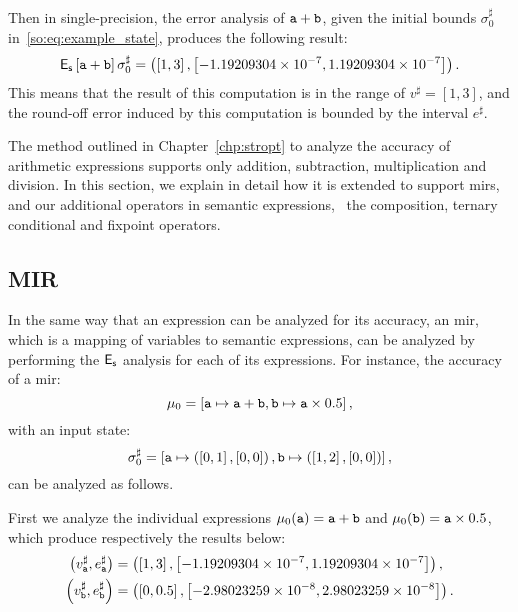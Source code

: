 Then in single-precision, the error analysis of $\texttt{a} + \texttt{b}$, given the
initial bounds $\sigma^\sharp_0$ in~\eqref{so:eq:example_state}, produces the
following result:
\begin{equation}
    \operatorname{\mathsf{E}_\mathsf{s}}\left[{\texttt{a} + \texttt{b}}\right]{\sigma^\sharp_0} = \left(
        \left[{1}, {3}\right],
        \left[{-1.19209304 \times 10^{-7}}, {1.19209304 \times 10^{-7}}\right]
    \right).
\end{equation}
This means that the result of this computation is in the range of $v^\sharp =
[1, 3]$, and the round-off error induced by this computation is bounded by the
interval $e^\sharp$.

The method outlined in Chapter~\ref{chp:stropt} to analyze the accuracy of
arithmetic expressions supports only addition, subtraction, multiplication and
division.  In this section, we explain in detail how it is extended to support
\glspl{mir}, and our additional operators in semantic expressions, \ie~the
composition, ternary conditional and fixpoint operators.

\subsection{MIR}

In the same way that an expression can be analyzed for its accuracy, an
\gls{mir}, which is a mapping of variables to semantic expressions, can
be analyzed by performing the $\operatorname{\mathsf{E}_\mathsf{s}}$ analysis for each of its
expressions.  For instance, the accuracy of a \gls{mir}\@:
\begin{equation}
    \mu_0 = \left[
        \texttt{a} \mapsto \texttt{a} + \texttt{b},
        \texttt{b} \mapsto \texttt{a} \times 0.5
    \right],
\end{equation}
with an input state:
\begin{equation}
    \sigma^\sharp_0 = \left[
        \texttt{a} \mapsto \left(
            \left[{0}, {1}\right], \left[{0}, {0}\right]
        \right),
        \texttt{b} \mapsto \left(
            \left[{1}, {2}\right], \left[{0}, {0}\right]
        \right)
    \right],
\end{equation}
can be analyzed as follows.

First we analyze the individual expressions $\mu_0(\texttt{a}) = \texttt{a} + \texttt{b}$
and $\mu_0(\texttt{b}) = \texttt{a} \times 0.5$, which produce respectively the results
below:
\begin{align}
    \left(
        v^\sharp_{\texttt{a}}, e^\sharp_{\texttt{a}}
    \right) &= \left(
        \left[{1}, {3}\right],
        \left[{-1.19209304 \times 10^{-7}}, {1.19209304 \times 10^{-7}}\right]
    \right), \\
    \left(
        v^\sharp_{\texttt{b}}, e^\sharp_{\texttt{b}}
    \right) &= \left(
        \left[{0}, {0.5}\right],
        \left[{-2.98023259 \times 10^{-8}}, {2.98023259 \times 10^{-8}}\right]
    \right).
\end{align}

